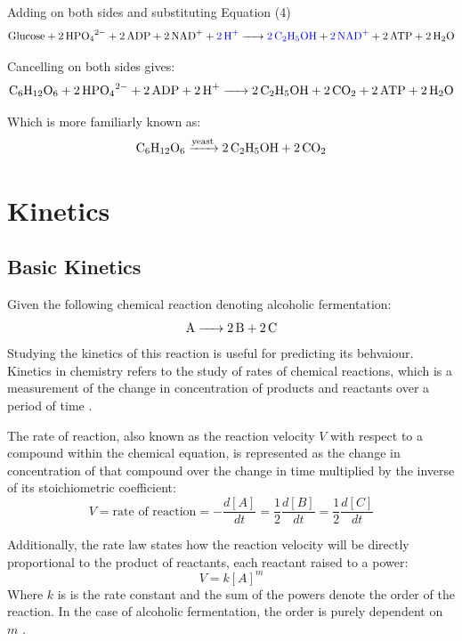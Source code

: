 \documentclass{article}
\begin{document}
Adding  on both sides and substituting Equation (4)
\begin{equation*}
    \ce{Glucose + 2HPO_{4}^{2-} + 2ADP + 2NAD+ + \textcolor{blue}{\ce{2H+}} -> \textcolor{blue}{\ce{2C2H5OH}} + \textcolor{blue}{\ce{2NAD+}} + 2ATP + 2H2O}
\end{equation*}

Cancelling  on both sides gives:
\begin{equation}
    \ce{C6H12O6 + 2HPO_{4}^{2-} + 2ADP + 2H+ -> 2C2H5OH + 2CO2 + 2ATP + 2H2O}
\end{equation}

Which is more familiarly known as:
\begin{equation}
    \ce{C6H12O6 ->[yeast] 2C2H5OH + 2CO2}
\end{equation}

\section{Kinetics}  %

\subsection{Basic Kinetics}
Given the following chemical reaction denoting alcoholic fermentation:
\begin{equation}
    \ce{A -> 2B + 2C}
\end{equation}
Studying the kinetics of this reaction is useful for predicting its behvaiour. Kinetics in chemistry refers to the study of rates of chemical reactions, which is a measurement of the change in concentration of products and reactants over a period of time \parencite{ref}.

\medskip

The rate of reaction, also known as the reaction velocity $V$ with respect to a compound within the chemical equation, is represented as the change in concentration of that compound over the change in time multiplied by the inverse of its stoichiometric coefficient:
\begin{equation}
    V = \text{rate of reaction} = -\frac{d[A]}{dt} = \frac{1}{2}\frac{d[B]}{dt} = \frac{1}{2}\frac{d[C]}{dt}
\end{equation}

Additionally, the rate law states how the reaction velocity will be directly proportional to the product of reactants, each reactant raised to a power:
\begin{equation}
    V = k[A]^m
\end{equation}
Where $k$ is is the rate constant and the sum of the powers denote the order of the reaction. In the case of alcoholic fermentation, the order is purely dependent on $m$ \parencite{ref}.
\end{document}
